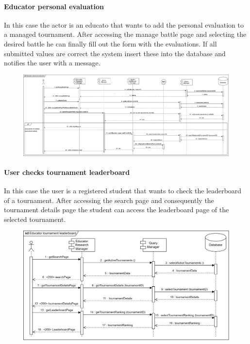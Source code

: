 \documentclass[12pt, a4paper]{report}
\begin{document}
    \paragraph*{Educator personal evaluation}
    In this case the actor is an educato that wants to add the personal evaluation to a managed tournament. 
    After accessing the manage battle page and selecting the desired battle he can finally fill out the form with the evaluations.
    If all submitted values are correct the system insert these into the database and notifies the user with a message.
    \begin{figure}[H]
        \centering
        \includegraphics[width=1.0\linewidth]{images/eperv.png}
    \end{figure}

    \paragraph*{User checks tournament leaderboard}
    In this case the user is a registered student that wants to check the leaderboard of a tournament. 
    After accessing the search page and consequently the tournament details page the student can access the leaderboard page of the selected tournament. 
    \begin{figure}[H]
        \centering
        \includegraphics[width=1.0\linewidth]{images/etlrv.png}
    \end{figure}
\end{document}
